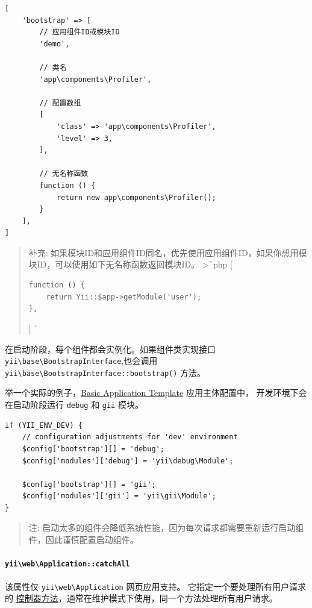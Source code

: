 \lstset{language=php}\begin{lstlisting}
[
    'bootstrap' => [
        // 应用组件ID或模块ID
        'demo',

        // 类名
        'app\components\Profiler',

        // 配置数组
        [
            'class' => 'app\components\Profiler',
            'level' => 3,
        ],

        // 无名称函数
        function () {
            return new app\components\Profiler();
        }
    ],
]
\end{lstlisting}
\begin{quote}补充: 如果模块ID和应用组件ID同名，优先使用应用组件ID，如果你想用模块ID，可以使用如下无名称函数返回模块ID。
>\lstinline|`|php
[

\begin{lstlisting}
function () {
    return Yii::$app->getModule('user');
},
\end{lstlisting}
]
\lstinline|`|

\end{quote}
在启动阶段，每个组件都会实例化。如果组件类实现接口 \texttt{yii{\allowbreak{}\textbackslash}base{\allowbreak{}\textbackslash}BootstrapInterface},也会调用 \texttt{yii{\allowbreak{}\textbackslash}base{\allowbreak{}\textbackslash}BootstrapInterface\allowbreak{}::\allowbreak{}bootstrap()} 方法。

举一个实际的例子，\hyperref[start-installation.md]{Basic Application Template} 应用主体配置中，
开发环境下会在启动阶段运行 \lstinline|debug| 和 \lstinline|gii| 模块。

\lstset{language=php}\begin{lstlisting}
if (YII_ENV_DEV) {
    // configuration adjustments for 'dev' environment
    $config['bootstrap'][] = 'debug';
    $config['modules']['debug'] = 'yii\debug\Module';

    $config['bootstrap'][] = 'gii';
    $config['modules']['gii'] = 'yii\gii\Module';
}
\end{lstlisting}
\begin{quote}注: 启动太多的组件会降低系统性能，因为每次请求都需要重新运行启动组件，因此谨慎配置启动组件。

\end{quote}
\paragraph{\texttt{yii{\allowbreak{}\textbackslash}web{\allowbreak{}\textbackslash}Application\allowbreak{}::\allowbreak{}catchAll} \label{structure-applications.md::catchAll}}
该属性仅 \texttt{yii{\allowbreak{}\textbackslash}web{\allowbreak{}\textbackslash}Application} 网页应用支持。
它指定一个要处理所有用户请求的 \hyperref[structure-controllers.md]{控制器方法}，通常在维护模式下使用，同一个方法处理所有用户请求。

